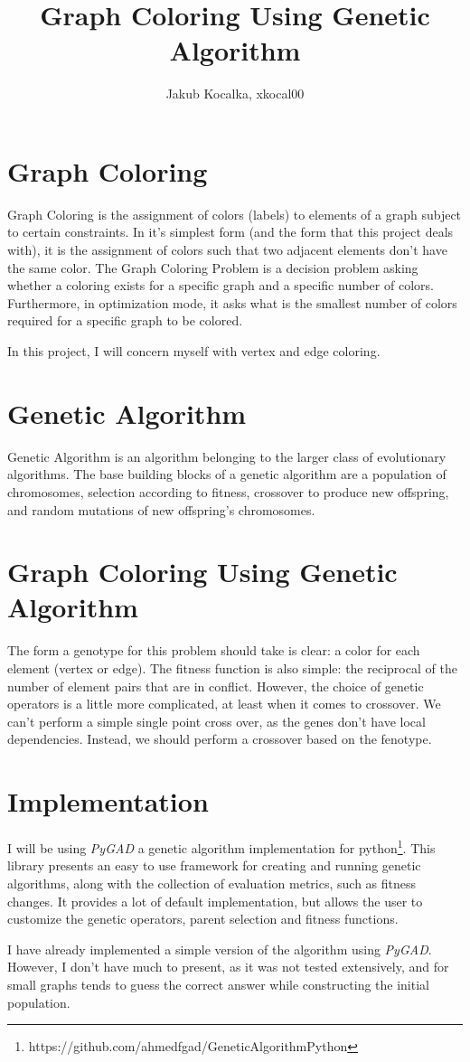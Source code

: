 \documentclass[]{article}
\title{Graph Coloring Using Genetic Algorithm}
\author{Jakub Kocalka, xkocal00}
\begin{document}
\maketitle

\section{Graph Coloring}
Graph Coloring is the assignment of colors (labels) to elements of a graph subject to certain constraints. In it's simplest form (and the form that this project deals with), it is the assignment of colors such that two adjacent elements don't have the same color. The Graph Coloring Problem is a decision problem asking whether a coloring exists for a specific graph and a specific number of colors. Furthermore, in optimization mode, it asks what is the smallest number of colors required for a specific graph to be colored.

In this project, I will concern myself with vertex and edge coloring.

\section{Genetic Algorithm}
Genetic Algorithm is an algorithm belonging to the larger class of evolutionary algorithms. The base building blocks of a genetic algorithm are a population of chromosomes, selection according to fitness, crossover to produce new offspring, and random mutations of new offspring's chromosomes\cite{GAIntro}.

\section{Graph Coloring Using Genetic Algorithm}
The form a genotype for this problem should take is clear: a color for each element (vertex or edge). The fitness function is also simple: the reciprocal of the number of element pairs that are in conflict. However, the choice of genetic operators is a little more complicated, at least when it comes to crossover. We can't perform a simple single point cross over, as the genes don't have local dependencies. Instead, we should perform a crossover based on the fenotype.

\section{Implementation}
I will be using \emph{PyGAD}\cite{gad2021pygad} a genetic algorithm implementation for python\footnote{https://github.com/ahmedfgad/GeneticAlgorithmPython}. This library presents an easy to use framework for creating and running genetic algorithms, along with the collection of evaluation metrics, such as fitness changes. It provides a lot of default implementation, but allows the user to customize the genetic operators, parent selection and fitness functions.

I have already implemented a simple version of the algorithm using \emph{PyGAD}. However, I don't have much to present, as it was not tested extensively, and for small graphs tends to guess the correct answer while constructing the initial population.

\printbibliography
\end{document}
